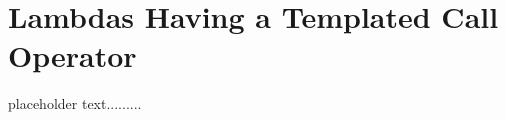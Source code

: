 \newpage
{}
\section[{\itshape Generic} Lambdas]{Lambdas Having a Templated Call Operator}\label{genericlambda}


placeholder text.........


